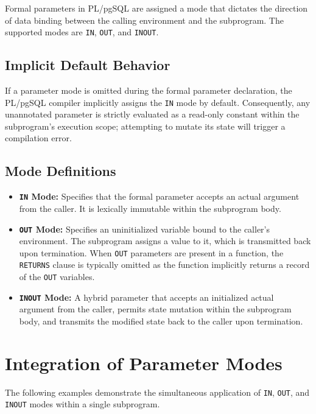 \documentclass[12pt,a4paper]{article}
\begin{document}
Formal parameters in PL/pgSQL are assigned a mode that dictates the direction of data binding between the calling environment and the subprogram. The supported modes are \texttt{IN}, \texttt{OUT}, and \texttt{INOUT}.

\subsection{Implicit Default Behavior}
If a parameter mode is omitted during the formal parameter declaration, the PL/pgSQL compiler implicitly assigns the \texttt{IN} mode by default. Consequently, any unannotated parameter is strictly evaluated as a read-only constant within the subprogram's execution scope; attempting to mutate its state will trigger a compilation error.

\subsection{Mode Definitions}
\begin{itemize}
	\item \textbf{\texttt{IN} Mode:} Specifies that the formal parameter accepts an actual argument from the caller. It is lexically immutable within the subprogram body.
	\item \textbf{\texttt{OUT} Mode:} Specifies an uninitialized variable bound to the caller's environment. The subprogram assigns a value to it, which is transmitted back upon termination. When \texttt{OUT} parameters are present in a function, the \texttt{RETURNS} clause is typically omitted as the function implicitly returns a record of the \texttt{OUT} variables.
	\item \textbf{\texttt{INOUT} Mode:} A hybrid parameter that accepts an initialized actual argument from the caller, permits state mutation within the subprogram body, and transmits the modified state back to the caller upon termination.
\end{itemize}

\section{Integration of Parameter Modes}

The following examples demonstrate the simultaneous application of \texttt{IN}, \texttt{OUT}, and \texttt{INOUT} modes within a single subprogram.
\end{document}
